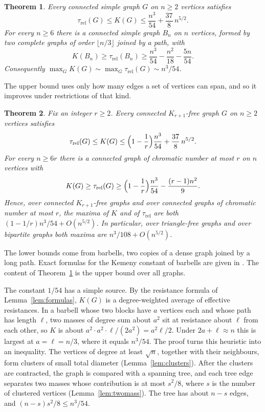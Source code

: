\documentclass[11pt]{amsart}
\numberwithin{equation}{section}
\newtheorem{theorem}{Theorem}[section]
\theoremstyle{remark}
\newcommand{\trel}{\tau_{\mathrm{rel}}}
\begin{document}
\begin{theorem}\label{thm:main}
Every connected simple graph $G$ on $n\ge2$ vertices satisfies
\begin{equation}\label{eq:upper}
\trel(G)\le K(G)\le\frac{n^3}{54}+\frac{37}{8}\,n^{5/2}.
\end{equation}
For every $n\ge6$ there is a connected simple graph $B_n$ on $n$ vertices, formed by two complete graphs of order $\lfloor n/3\rfloor$ joined by a path, with
\begin{equation}\label{eq:lower}
K(B_n)\ge\trel(B_n)\ge\frac{n^3}{54}-\frac{n^2}{18}-\frac{5n}{54}.
\end{equation}
Consequently $\max_GK(G)\sim\max_G\trel(G)\sim n^3/54$.
\end{theorem}

The upper bound uses only how many edges a set of vertices can span, and so it improves under restrictions of that kind.

\begin{theorem}\label{thm:clique}
Fix an integer $r\ge2$. Every connected $K_{r+1}$-free graph $G$ on $n\ge2$ vertices satisfies
\begin{equation}\label{eq:clique-upper}
\trel(G)\le K(G)\le\Bigl(1-\frac1r\Bigr)\frac{n^3}{54}+\frac{37}{8}\,n^{5/2}.
\end{equation}
For every $n\ge6r$ there is a connected graph of chromatic number at most $r$ on $n$ vertices with
\begin{equation}\label{eq:clique-lower}
K(G)\ge\trel(G)\ge\Bigl(1-\frac1r\Bigr)\frac{n^3}{54}-\frac{(r-1)n^2}{9}.
\end{equation}
Hence, over connected $K_{r+1}$-free graphs and over connected graphs of chromatic number at most $r$, the maxima of $K$ and of $\trel$ are both $(1-1/r)n^3/54+O(n^{5/2})$. In particular, over triangle-free graphs and over bipartite graphs both maxima are $n^3/108+O(n^{5/2})$.
\end{theorem}

The lower bounds come from barbells, two copies of a dense graph joined by a long path. Exact formulas for the Kemeny constant of barbells are given in \cite{Breen,Faught}. The content of Theorem~\ref{thm:main} is the upper bound over all graphs.

The constant $1/54$ has a simple source. By the resistance formula of Lemma~\ref{lem:formulas}, $K(G)$ is a degree-weighted average of effective resistances. In a barbell whose two blocks have $a$ vertices each and whose path has length $\ell$, two masses of degree sum about $a^2$ sit at resistance about $\ell$ from each other, so $K$ is about $a^2\cdot a^2\cdot\ell/(2a^2)=a^2\ell/2$. Under $2a+\ell\approx n$ this is largest at $a=\ell=n/3$, where it equals $n^3/54$. The proof turns this heuristic into an inequality. The vertices of degree at least $\sqrt n$, together with their neighbours, form clusters of small total diameter (Lemma~\ref{lem:clusters}). After the clusters are contracted, the graph is compared with a spanning tree, and each tree edge separates two masses whose contribution is at most $s^2/8$, where $s$ is the number of clustered vertices (Lemma~\ref{lem:twomass}). The tree has about $n-s$ edges, and $(n-s)s^2/8\le n^3/54$.
\end{document}
